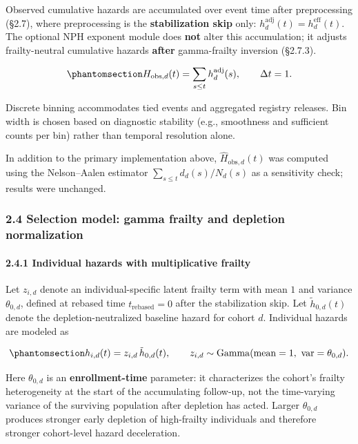 \documentclass[
]{article}
\begin{document}
Observed cumulative hazards are accumulated over event time after
preprocessing (§2.7), where preprocessing is the \textbf{stabilization
skip} only: \(h_d^{\mathrm{adj}}(t)=h_d^{\mathrm{eff}}(t)\). The
optional NPH exponent module does \textbf{not} alter this accumulation;
it adjusts frailty-neutral cumulative hazards \textbf{after}
gamma-frailty inversion (§2.7.3).

\begin{equation}\protect\phantomsection\label{eq:cumhazard-observed}{
H_{\mathrm{obs},d}(t) = \sum_{s \le t} h_d^{\mathrm{adj}}(s),
\qquad \Delta t = 1.
}\end{equation}

Discrete binning accommodates tied events and aggregated registry
releases. Bin width is chosen based on diagnostic stability (e.g.,
smoothness and sufficient counts per bin) rather than temporal
resolution alone.

In addition to the primary implementation above,
\(\hat H_{\mathrm{obs},d}(t)\) was computed using the Nelson--Aalen
estimator \(\sum_{s \le t} d_d(s)/N_d(s)\) as a sensitivity check;
results were unchanged.

\subsubsection{2.4 Selection model: gamma frailty and depletion
normalization}\label{selection-model-gamma-frailty-and-depletion-normalization}

\paragraph{2.4.1 Individual hazards with multiplicative
frailty}\label{individual-hazards-with-multiplicative-frailty}

Let \(z_{i,d}\) denote an individual-specific latent frailty term with
mean \(1\) and variance \(\theta_{0,d}\), defined at rebased time
\(t_{\mathrm{rebased}}=0\) after the stabilization skip. Let
\(\tilde h_{0,d}(t)\) denote the depletion-neutralized baseline hazard
for cohort \(d\). Individual hazards are modeled as

\begin{equation}\protect\phantomsection\label{eq:individual-hazard-frailty}{
h_{i,d}(t) = z_{i,d}\,\tilde h_{0,d}(t),
\qquad
z_{i,d} \sim \mathrm{Gamma}(\mathrm{mean}=1,\ \mathrm{var}=\theta_{0,d}).
}\end{equation}

Here \(\theta_{0,d}\) is an \textbf{enrollment-time} parameter: it
characterizes the cohort's frailty heterogeneity at the start of the
accumulating follow-up, not the time-varying variance of the surviving
population after depletion has acted. Larger \(\theta_{0,d}\) produces
stronger early depletion of high-frailty individuals and therefore
stronger cohort-level hazard deceleration.
\end{document}

